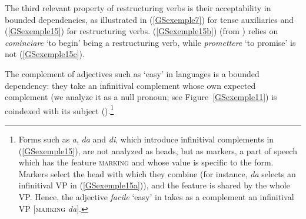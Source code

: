The third relevant property of restructuring verbs is their acceptability in bounded dependencies, as illustrated in (\ref{GSexemple7}) for tense auxiliaries and (\ref{GSexemple15}) for restructuring verbs. (\ref{GSexemple15b}) (from \citealt[341]{Monachesi98a}) relies on \emph{cominciare} `to begin' being a restructuring verb, while \emph{promettere} `to promise' is not (\ref{GSexemple15c}).  

\eal 
	\label{GSexemple15} 
    \label{GSexemple15a} 
		
	\label{GSexemple15b}
		
	\label{GSexemple15c} 	
\zl

\largerpage[1.2]
\noindent
The complement of adjectives such as `easy' in  languages is a bound\-ed dependency: they take an infinitival complement whose own expected complement (we analyze it as a null pronoun; see Figure~\ref{GSexemple11}) is coindexed with its subject (\citealt{AGS1998, Monachesi98a}).\footnote{Forms such as \emph{a}, \emph{da} and \emph{di}, which introduce infinitival complements in (\ref{GSexemple15}), are not analyzed as heads, but as markers, a part of speech which has the feature \textsc{marking} and whose value is specific to the form. Markers select the head with which they combine (for instance, \emph{da} selects an infinitival VP in (\ref{GSexemple15a})), and the feature is shared by the whole VP. Hence, the adjective \emph{facile} `easy' in  takes as a complement an infinitival VP [\textsc{marking} \emph{da}].}

\ea
{}
\z

